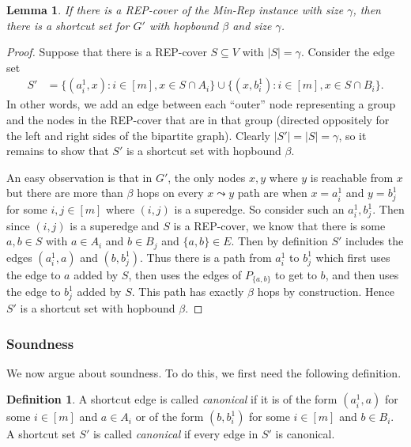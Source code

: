 \documentclass{article}
\newtheorem{lemma}[theorem]{Lemma}
\theoremstyle{definition}
\newtheorem{definition}{Definition}
\theoremstyle{remark}
\begin{document}
\begin{lemma} \label{lem:completeness}
    If there is a REP-cover of the Min-Rep instance with size $\gamma$, then there is a shortcut set for $G'$ with hopbound $\beta$ and size $\gamma$.
\end{lemma}
\begin{proof}
Suppose that there is a REP-cover $S \subseteq V$ with $|S|= \gamma$.  Consider the edge set 
\begin{align*}
    S' &= \{(a_i^1, x) : i \in [m], x \in S \cap A_i\} \cup \{(x, b_i^1) : i \in [m], x \in S \cap B_i\}.
\end{align*}
In other words, we add an edge between each ``outer'' node representing a group and the nodes in the REP-cover that are in that group (directed oppositely for the left and right sides of the bipartite graph).  Clearly $|S'| = |S| = \gamma$, so it remains to show that $S'$ is a shortcut set with hopbound $\beta$.  

An easy observation is that in $G'$, the only nodes $x, y$ where $y$ is reachable from $x$ but there are more than $\beta$ hops on every $x \leadsto y$ path are when $x = a_i^1$ and $y = b_j^1$ for some $i,j \in [m]$ where $(i,j)$ is a superedge.  So consider such an $a_i^1, b_j^1$.  Then since $(i,j)$ is a superedge and $S$ is a REP-cover, we know that there is some $a,b \in S$ with $a \in A_i$ and $b \in B_j$ and $\{a,b\} \in E$.  Then by definition $S'$ includes the edges $(a_i^1, a)$ and $(b, b_j^1)$.  Thus there is a path from $a_i^1$ to $b_j^1$ which first uses the edge to $a$ added by $S$, then uses the edges of $P_{\{a,b\}}$ to get to $b$, and then uses the edge to $b_j^1$ added by $S$.  This path has exactly $\beta$ hops by construction.  Hence $S'$ is a shortcut set with hopbound $\beta$.
\end{proof}

\subsubsection{Soundness}
We now argue about soundness.  To do this, we first need the following definition.

\begin{definition} \label{def:canonical}
    A shortcut edge is called \emph{canonical} if it is of the form $(a_i^1, a)$ for some $i \in [m]$ and $a \in A_i$ or of the form $(b, b_i^1)$ for some $i \in [m]$ and $b \in B_i$.  A shortcut set $S'$ is called \emph{canonical} if every edge in $S'$ is canonical. 
\end{definition}
\end{document}
